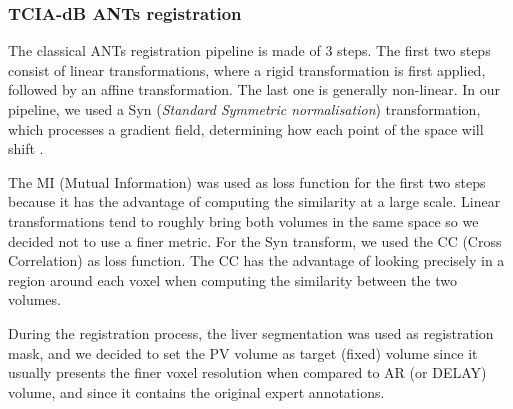 \documentclass[]{article}
\begin{document}
\subsubsection{TCIA-dB ANTs registration}\label{tcia-db-ants-registration}

The classical ANTs registration pipeline is made of 3 steps. The first
two steps consist of linear transformations, where a rigid
transformation is first applied, followed by an affine transformation.
The last one is generally non-linear. In our pipeline,
we used a Syn (\emph{Standard Symmetric normalisation}) transformation, which
processes a gradient field, determining how each point of the space will
shift \cite{Avants2008}.

The MI (Mutual Information) was used as loss function for the first two
steps because it has the advantage of computing the similarity at a
large scale. Linear transformations tend to roughly bring both volumes
in the same space so we decided not to use a finer metric. For the Syn
transform, we used the CC (Cross Correlation) as loss function. The CC
has the advantage of looking precisely in a region around each voxel
when computing the similarity between the two volumes.

During the registration process, the liver segmentation was used as
registration mask, and we decided to set the PV volume as target (fixed)
volume since it usually presents the finer voxel resolution when
compared to AR (or DELAY) volume, and since it contains the original
expert annotations.
\end{document}
